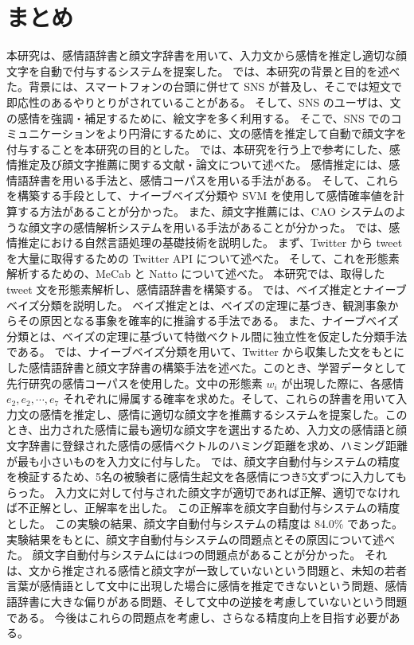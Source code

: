 \documentclass[11pt,a4j]{jsarticle}
\begin{document}
\section{まとめ}\label{sec:summary}
本研究は、感情語辞書と顔文字辞書を用いて、入力文から感情を推定し適切な顔文字を自動で付与するシステムを提案した。
では、本研究の背景と目的を述べた。背景には、スマートフォンの台頭に併せて SNS が普及し、そこでは短文で即応性のあるやりとりがされていることがある。
そして、SNS のユーザは、文の感情を強調・補足するために、絵文字を多く利用する。
そこで、SNS でのコミュニケーションをより円滑にするために、文の感情を推定して自動で顔文字を付与することを本研究の目的とした。
では、本研究を行う上で参考にした、感情推定及び顔文字推薦に関する文献・論文について述べた。
感情推定には、感情語辞書を用いる手法と、感情コーパスを用いる手法がある。
そして、これらを構築する手段として、ナイーブベイズ分類や SVM を使用して感情確率値を計算する方法があることが分かった。
また、顔文字推薦には、CAO システムのような顔文字の感情解析システムを用いる手法があることが分かった。
では、感情推定における自然言語処理の基礎技術を説明した。
まず、Twitter から tweet を大量に取得するための Twitter API について述べた。
そして、これを形態素解析するための、MeCab と Natto について述べた。
本研究では、取得した tweet 文を形態素解析し、感情語辞書を構築する。
では、ベイズ推定とナイーブベイズ分類を説明した。
ベイズ推定とは、ベイズの定理に基づき、観測事象からその原因となる事象を確率的に推論する手法である。
また、ナイーブベイズ分類とは、ベイズの定理に基づいて特徴ベクトル間に独立性を仮定した分類手法である。
では、ナイーブベイズ分類を用いて、Twitter から収集した文をもとにした感情語辞書と顔文字辞書の構築手法を述べた。このとき、学習データとして先行研究の感情コーパスを使用した。文中の形態素 $w_i$ が出現した際に、各感情 $e_2,e_2, \cdots ,e_7$ それぞれに帰属する確率を求めた。そして、これらの辞書を用いて入力文の感情を推定し、感情に適切な顔文字を推薦するシステムを提案した。このとき、出力された感情に最も適切な顔文字を選出するため、入力文の感情語と顔文字辞書に登録された感情の感情ベクトルのハミング距離を求め、ハミング距離が最も小さいものを入力文に付与した。
では、顔文字自動付与システムの精度を検証するため、5名の被験者に感情生起文を各感情につき5文ずつに入力してもらった。
入力文に対して付与された顔文字が適切であれば正解、適切でなければ不正解とし、正解率を出した。
この正解率を顔文字自動付与システムの精度とした。
この実験の結果、顔文字自動付与システムの精度は 84.0\% であった。
実験結果をもとに、顔文字自動付与システムの問題点とその原因について述べた。
顔文字自動付与システムには4つの問題点があることが分かった。
それは、文から推定される感情と顔文字が一致していないという問題と、未知の若者言葉が感情語として文中に出現した場合に感情を推定できないという問題、感情語辞書に大きな偏りがある問題、そして文中の逆接を考慮していないという問題である。
今後はこれらの問題点を考慮し、さらなる精度向上を目指す必要がある。

 \clearpage
 
\end{document}
